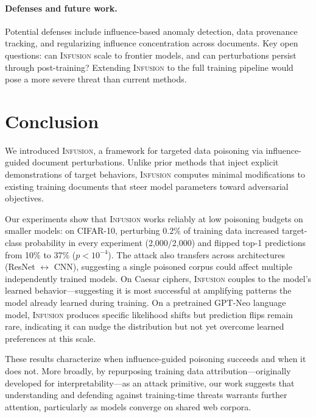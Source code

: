 \documentclass{article} %
\begin{document}
\paragraph{Defenses and future work.}
Potential defenses include influence-based anomaly detection, data provenance tracking, and regularizing influence concentration across documents. Key open questions: can \textsc{Infusion} scale to frontier models, and can perturbations persist through post-training? Extending \textsc{Infusion} to the full training pipeline would pose a more severe threat than current methods.



\section{Conclusion}


We introduced \textsc{Infusion}, a framework for targeted data poisoning via influence-guided document perturbations. Unlike prior methods that inject explicit demonstrations of target behaviors, \textsc{Infusion} computes minimal modifications to existing training documents that steer model parameters toward adversarial objectives.

Our experiments show that \textsc{Infusion} works reliably at low poisoning budgets on smaller models: on CIFAR-10, perturbing 0.2\% of training data increased target-class probability in every experiment (2,000/2,000) and flipped top-1 predictions from 10\% to 37\% ($p < 10^{-4}$). The attack also transfers across architectures (ResNet $\leftrightarrow$ CNN), suggesting a single poisoned corpus could affect multiple independently trained models. On Caesar ciphers, \textsc{Infusion} couples to the model's learned behavior---suggesting it is most successful at amplifying patterns the model already learned during training. On a pretrained GPT-Neo language model, \textsc{Infusion} produces specific likelihood shifts but prediction flips remain rare, indicating it can nudge the distribution but not yet overcome learned preferences at this scale.

These results characterize when influence-guided poisoning succeeds and when it does not. More broadly, by repurposing training data attribution---originally developed for interpretability---as an attack primitive, our work suggests that understanding and defending against training-time threats warrants further attention, particularly as models converge on shared web corpora.

\end{document}
